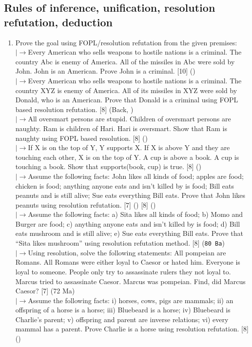 \documentclass[12pt]{article}
\newcommand{\lb}{\\$\left|\rightarrow\right.$}
\begin{document}
  \subsection{Rules of inference, unification, resolution refutation, deduction}
    \begin{enumerate}[topsep=0pt, noitemsep]
      \item Prove the goal using FOPL/resolution refutation from the given premises:
        \lb Every American who sells weapons to hostile nations is a criminal. The country Abc is enemy of America. All of the missiles in Abc were sold by John. John is an American. Prove John is a criminal. \hfill [10] ()
        \lb Every American who sells weapons to hostile nations is a criminal. The country XYZ is enemy of America. All of its missiles in XYZ were sold by Donald, who is an American. Prove that Donald is a criminal using FOPL based resolution refutation. \hfill [8] (Back, )
        \lb All oversmart persons are stupid. Children of oversmart persons are naughty. Ram is children of Hari. Hari is oversmart. Show that Ram is naughty using FOPL based resolution. \hfill [8] ()
        \lb If X is on the top of Y, Y supports X. If X is above Y and they are touching each other, X is on the top of Y. A cup is above a book. A cup is touching a book. Show that supports(book, cup) is true. \hfill [8] ()
        \lb Assume the following facts: John likes all kinds of food; apples are food; chicken is food; anything anyone eats and isn't killed by is food; Bill eats peanuts and is still alive; Sue eats everything Bill eats. Prove that John likes peanuts using resolution refutation. \hfill [7] () [8] ()
        \lb Assume the following facts: a) Sita likes all kinds of food; b) Momo and Burger are food; c) anything anyone eats and isn't killed by is food; d) Bill eats mushroom and is still alive; e) Sue eats everything Bill eats. Prove that ``Sita likes mushroom'' using resolution refutation method. \hfill [8] (\texttt{80 Ba})
        \lb Using resolution, solve the following statements: All pompeian are Romans. All Romans were either loyal to Caesor or hated him. Everyone is loyal to someone. People only try to assassinate rulers they not loyal to. Marcus tried to assassinate Caesor. Marcus was pompeian. Find, did Marcus Caesor? \hfill [7] (72 Ma)
        \lb Assume the following facts: i) horses, cows, pigs are mammals; ii) an offspring of a horse is a horse; iii) Bluebeard is a horse; iv) Bluebeard is Charlie's parent; v) offspring and parent are inverse relations; vi) every mammal has a parent. Prove Charlie is a horse using resolution refutation. \hfill [8] ()

\end{enumerate}
\end{document}
